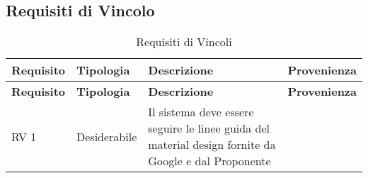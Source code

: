 \subsection{Requisiti di Vincolo}{
		\renewcommand*{\arraystretch}{1.4}
		\begin{longtable} [c]{| p{2.5cm} | p{2.5cm} | p{6cm} |p{2.5cm}|}
			\caption{Requisiti di Vincoli \label{tab:reqVincoli}}\\
			 \hline
			 \textbf{Requisito} & \textbf{Tipologia} & \textbf{Descrizione} & \textbf{Provenienza} \\
			 \hline
			 \endfirsthead
			 \hline
			 \textbf{Requisito} & \textbf{Tipologia} & \textbf{Descrizione} & \textbf{Provenienza} \\
			 \hline
				\endhead
			 \hline
			 \endfoot
			 \hline
			 \endlastfoot
			RV 1 & Desiderabile & Il sistema deve essere seguire le linee guida del material design fornite da Google e dal Proponente\\
		\end{longtable}
	}